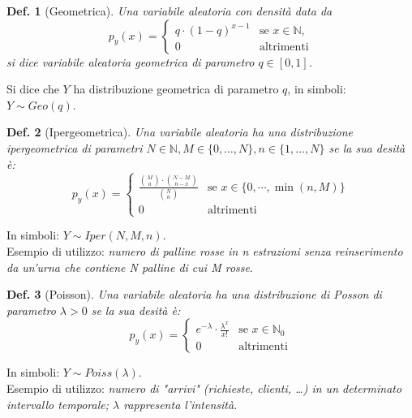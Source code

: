 \documentclass{article}
\newtheorem{definition}{Def.}[section]
\begin{document}
\begin{definition}[Geometrica]
	Una variabile aleatoria con densità data da
	\begin{equation}
		p_y(x) =
		\begin{cases}
			q \cdot (1-q)^{x-1} & \text{se } x \in \mathbb{N},\\
			0 & \text{altrimenti}
		\end{cases}
	\end{equation}
	si dice variabile aleatoria geometrica di parametro $q \in [0, 1]$.
\end{definition}

Si dice che $Y$ ha distribuzione geometrica di parametro $q$, in simboli:
$Y \sim Geo(q)$.

\begin{definition}[Ipergeometrica]
	Una variabile aleatoria ha una distribuzione ipergeometrica di parametri $N
	\in \mathbb{N}, M \in \{0, \dots, N\}, n \in \{1, \dots, N\}$ se la sua
	desità è:
	\begin{equation}
		p_y(x) =
		\begin{cases}
			\frac{\binom{M}{a} \cdot \binom{N-M}{n-x}}{\binom{N}{n}} & \text{se
			} x \in \{0, \cdots, \min(n, M)\}\\
			0 & \text{altrimenti}
		\end{cases}
	\end{equation}
\end{definition}

In simboli: $Y \sim Iper(N, M, n)$.\\
Esempio di utilizzo: \textit{numero di palline rosse in n estrazioni senza
reinserimento da un'urna che contiene N palline di cui M rosse}.

\begin{definition}[Poisson]
	Una variabile aleatoria ha una distribuzione di Posson di parametro $\lambda
	> 0$ se la sua desità è:
	\begin{equation}
		p_y(x) =
		\begin{cases}
			e^{-\lambda} \cdot \frac{\lambda ^ x}{x!} & \text{se } x \in
			\mathbb{N}_0\\
			0 & \text{altrimenti}
		\end{cases}
	\end{equation}
\end{definition}

In simboli: $Y \sim Poiss(\lambda)$.\\
Esempio di utilizzo: \textit{numero di "arrivi" (richieste, clienti, \dots) in
un determinato intervallo temporale; $\lambda$ rappresenta l'intensità}.
\end{document}
